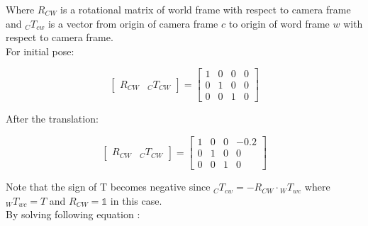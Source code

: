 \documentclass[12pt]{article}
\begin{document}
\noindent Where $R_{CW}$ is a rotational matrix of world frame with respect to camera frame and ${}_{C}T_{cw}$ is a vector from origin of camera frame $c$ to origin of word frame $w$ with respect to camera frame. \\

\noindent For initial pose:

\begin{equation}
	\begin{bmatrix}
		R_{CW} & {}_{C}T_{CW}
	\end{bmatrix}
	= 
	\begin{bmatrix}
		1	&	0	& 	0	&	0 \\
		0	&	1	&	0	&	0 \\
		0	&	0	&	1	&	0 
	\end{bmatrix}
\end{equation} 

\noindent After the translation: 

\begin{equation}
	\begin{bmatrix}
		R_{CW} & {}_{C}T_{CW}
	\end{bmatrix}
	= 
	\begin{bmatrix}
		1	&	0	& 	0	&	-0.2 \\
		0	&	1	&	0	&	0 \\
		0	&	0	&	1	&	0 
	\end{bmatrix}
\end{equation} 

\noindent Note that the sign of T becomes negative since ${}_{C}T_{cw} = - R_{CW} \cdot {}_{W}T_{wc}$ where ${}_{W}T_{wc} = T$ and $R_{CW} = \mathds{1}$ in this case. \\

\noindent By solving following equation :
\end{document}
